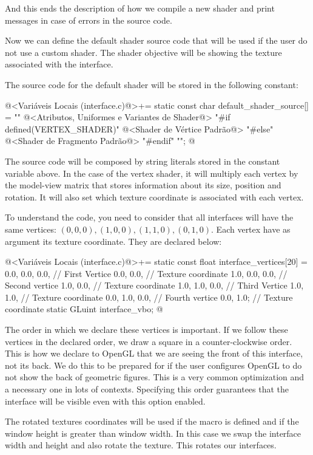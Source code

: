 And this ends the description of how we compile a new shader and print
messages in case of errors in the source code.

Now we can define the default shader source code that will be used if
the user do not use a custom shader. The shader objective will be
showing the texture associated with the interface.

The source code for the default shader will be stored in the following
constant:

\iniciocodigo
@<Variáveis Locais (interface.c)@>+=
static const char default_shader_source[] = ""
@<Atributos, Uniformes e Variantes de Shader@>
"#if defined(VERTEX_SHADER)\n"
@<Shader de Vértice Padrão@>
"#else\n"
@<Shader de Fragmento Padrão@>
"#endif\n"
                                           "";
@
\fimcodigo

The source code will be composed by string literals stored in the
constant variable above. In the case of the vertex shader, it will
multiply each vertex by the model-view matrix that stores information
about its size, position and rotation. It will also set which texture
coordinate is associated with each vertex.

To understand the code, you need to consider that all interfaces will
have the same vertices: $(0, 0, 0), (1, 0, 0), (1, 1, 0), (0, 1,
0)$. Each vertex have as argument its texture coordinate. They are
declared below:

\iniciocodigo
@<Variáveis Locais (interface.c)@>+=
static const float interface_vertices[20] = {
  0.0, 0.0, 0.0, // First Vertice
  0.0, 0.0,     // Texture coordinate
  1.0, 0.0, 0.0, // Second vertice
  1.0, 0.0,     // Texture coordinate
  1.0, 1.0, 0.0,  // Third Vertice
  1.0, 1.0,      // Texture coordinate
  0.0, 1.0, 0.0, // Fourth vertice
  0.0, 1.0};    // Texture coordinate
static GLuint interface_vbo;
@
\fimcodigo

The order in which we declare these vertices is important. If we
follow these vertices in the declared order, we draw a square in a
counter-clockwise order. This is how we declare to OpenGL that we are
seeing the front of this interface, not its back. We do this to be
prepared for if the user configures OpenGL to do not show the back of
geometric figures. This is a very common optimization and a necessary
one in lots of contexts. Specifying this order guarantees that the
interface will be visible even with this option enabled.

The rotated textures coordinates will be used if the
macro  is defined and if the window
height is greater than window width. In this case we swap the
interface width and height and also rotate the texture. This rotates
our interfaces.

